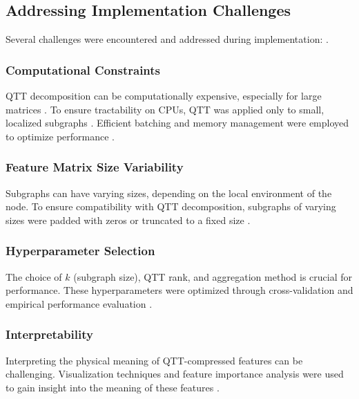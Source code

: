 \documentclass[twocolumn]{aastex631}
\begin{document}
\subsection{Addressing Implementation Challenges}
Several challenges were encountered and addressed during implementation: \citep{daiß2024asynchronousmanytasksystemschallengesopportunities,zingale2024challengesmodelingastrophysicalreacting,baker2025significantchallengesastrophysicalinference,pasquini2025reviewdetectorrequirementschallenges}.

\subsubsection{Computational Constraints}
QTT decomposition can be computationally expensive, especially for large matrices \citep{ye2024quantizedtensornetworkssolving}. To ensure tractability on CPUs, QTT was applied only to small, localized subgraphs \citep{ye2024quantizedtensornetworkssolving}. Efficient batching and memory management were employed to optimize performance \citep{ye2024quantizedtensornetworkssolving}.

\subsubsection{Feature Matrix Size Variability}
Subgraphs can have varying sizes, depending on the local environment of the node. To ensure compatibility with QTT decomposition, subgraphs of varying sizes were padded with zeros or truncated to a fixed size \citep{ye2024quantizedtensornetworkssolving}.

\subsubsection{Hyperparameter Selection}
The choice of \(k\) (subgraph size), QTT rank, and aggregation method is crucial for performance. These hyperparameters were optimized through cross-validation and empirical performance evaluation \citep{cerino2023hyperparameteroptimizationhpgreedyreduced,fowler2024futurelooksdarkimproving,thomas2025optimizingneuralnetworksurrogate}.

\subsubsection{Interpretability}
Interpreting the physical meaning of QTT-compressed features can be challenging. Visualization techniques and feature importance analysis were used to gain insight into the meaning of these features \citep{disanto2016analysisfeaturerelevanceclassification,meng2021machinelearninginterpretationcorrelation,ramos2024fastneuralemulatorinterstellar}.
\end{document}
